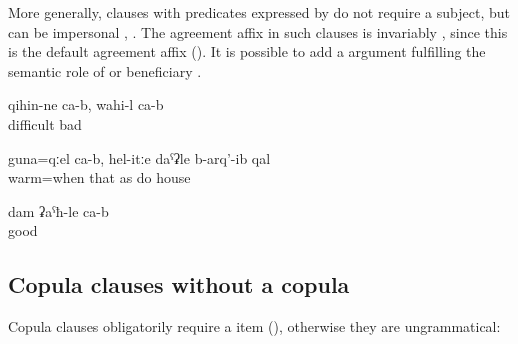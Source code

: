 More generally,  clauses with predicates expressed by  do not require a subject, but can be impersonal , . The  agreement affix in such clauses is invariably , since this is the default agreement affix (). It is possible to add a  argument fulfilling the semantic role of  or beneficiary .

\begin{exe}
	\ex	\label{ex:‎It is difficult, it is bad}
	\gll	qihin-ne	ca-b,	wahi-l	ca-b	\\
		difficult		bad		\\
	\glt	{}

	\ex	\label{ex:‎When it is warm (i.e. in warm places) the houses are built like this}
	\gll	guna=qːel	ca-b,	hel-itːe	daˁʡle	b-arq'-ib	qal\\
		warm=when		that	as	do	house	\\
	\glt	{}

	\ex	\label{ex:I am well}
	\gll	dam ʡaˁħ-le ca-b\\
			good	\\
	\glt	{}
\end{exe}



\subsection{Copula clauses without a copula}
\label{ssec:Copula clauses without a copula}

Copula clauses obligatorily require a  item (), otherwise they are ungrammatical: 

\begin{exe}

\end{exe}

